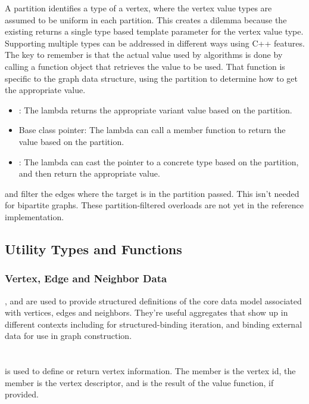A partition identifies a type of a vertex, where the vertex value types are assumed to be uniform in each partition. This creates a dilemma because 
the existing  returns a single type based template parameter for the vertex value type. Supporting 
multiple types can be addressed in different ways using C++ features. The key to remember is that the actual value used by algorithms is done
by calling a function object that retrieves the value to be used. That function is specific to the graph data structure, using the partition to 
determine how to get the appropriate value.
\begin{itemize}
    \item
          : The lambda returns the appropriate variant value based on the partition.
    \item
          Base class pointer: The lambda can call a member function to return the value based on the partition.
    \item
          : The lambda can cast the pointer to a concrete type based on the partition, and
          then return the appropriate value.
\end{itemize}

 and  filter the edges where the target is in the partition  passed.
This isn't needed for bipartite graphs. These partition-filtered  overloads are not yet in the reference implementation.

\subsection{Utility Types and Functions}

\subsubsection{Vertex, Edge and Neighbor Data}
,  and  are used to provide structured
definitions of the core data model associated with vertices, edges and neighbors. They're
useful aggregates that show up in different contexts including for structured-binding iteration,
and binding external data for use in graph construction.

\paragraph{}\label{vertex-view}\mbox{} \\
 is used to define or return vertex information. The  member is the vertex id, the  member is the vertex descriptor,
and  is the result of the value function, if provided.

